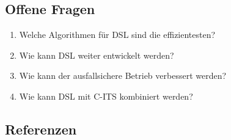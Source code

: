 \documentclass[
]{book}
\providecommand{\tightlist}{%
  \setlength{\itemsep}{0pt}\setlength{\parskip}{0pt}}
\begin{document}
\hypertarget{offene-fragen-14}{%
\subsection*{Offene Fragen}\label{offene-fragen-14}}

\begin{enumerate}
\def\labelenumi{\arabic{enumi}.}
\tightlist
\item
  Welche Algorithmen für DSL sind die effizientesten?
\item
  Wie kann DSL weiter entwickelt werden?
\item
  Wie kann der ausfallsichere Betrieb verbessert werden?
\item
  Wie kann DSL mit C-ITS kombiniert werden?
\end{enumerate}

\hypertarget{referenzen-14}{%
\subsection*{Referenzen}\label{referenzen-14}}
\end{document}

